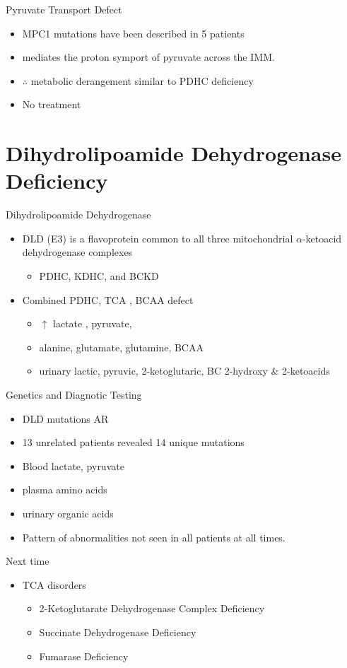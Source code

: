 \documentclass[presentation, smaller]{beamer}
\begin{document}
\begin{frame}[label={sec:orgd89847d}]{Pyruvate Transport Defect}
\begin{itemize}
\item MPC1 mutations have been described in 5 patients
\item mediates the proton symport of pyruvate across the IMM.
\item \(\therefore\) metabolic derangement similar to PDHC deficiency

\item No treatment
\end{itemize}
\end{frame}

\section{Dihydrolipoamide Dehydrogenase Deficiency}
\label{sec:orga850d0c}
\begin{frame}[label={sec:orgd5a4548}]{Dihydrolipoamide Dehydrogenase}
\begin{itemize}
\item DLD (E3) is a flavoprotein common to all three mitochondrial
\(\alpha\)-ketoacid dehydrogenase complexes
\begin{itemize}
\item PDHC, KDHC, and BCKD
\end{itemize}
\item Combined PDHC, TCA , BCAA defect
\begin{itemize}
\item \(\uparrow\) lactate , pyruvate,
\item alanine, glutamate, glutamine, BCAA
\item urinary lactic, pyruvic, 2-ketoglutaric, BC 2-hydroxy \& 2-ketoacids
\end{itemize}
\end{itemize}
\end{frame}

\begin{frame}[label={sec:org94a168d}]{Genetics and Diagnotic Testing}
\begin{itemize}
\item DLD mutations AR
\item 13 unrelated patients revealed 14 unique mutations

\item Blood lactate, pyruvate
\item plasma amino acids
\item urinary organic acids
\item Pattern of abnormalities not seen in all patients at all times.
\end{itemize}
\end{frame}

\begin{frame}[label={sec:org5157696}]{Next time}
\begin{itemize}
\item TCA disorders
\begin{itemize}
\item 2-Ketoglutarate Dehydrogenase Complex Deficiency
\item Succinate Dehydrogenase Deficiency
\item Fumarase Deficiency
\end{itemize}
\end{itemize}
\end{frame}
\end{document}
